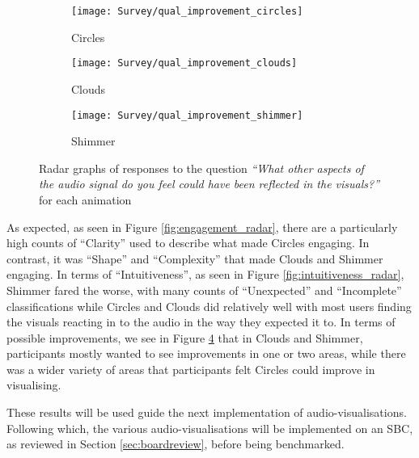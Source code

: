 \documentclass[../initial_thesis.tex]{subfiles}
\begin{document}
\begin{figure}
  \begin{subfigure}{0.5\textwidth}
    \centering
    \texttt{[image: Survey/qual\_improvement\_circles]}
    \caption{Circles}
    \label{fig:improvement_circles}
  \end{subfigure}
  \begin{subfigure}{0.5\textwidth}
    \centering
    \texttt{[image: Survey/qual\_improvement\_clouds]}
    \caption{Clouds}
    \label{fig:improvement_clouds}
  \end{subfigure}
  \begin{subfigure}{0.5\textwidth}
    \centering
    \texttt{[image: Survey/qual\_improvement\_shimmer]}
    \caption{Shimmer}
    \label{fig:improvement_shimmer}
  \end{subfigure}
  \caption{Radar graphs of responses to the question \textit{``What other aspects of the audio signal do you feel could have been reflected in the visuals?''} for each animation}
  \label{fig:improvement_radar}
\end{figure}

As expected, as seen in Figure \ref{fig:engagement_radar}, there are a particularly high counts of ``Clarity'' used to describe what made Circles engaging. In contrast, it was ``Shape'' and ``Complexity'' that made Clouds and Shimmer engaging. In terms of ``Intuitiveness'', as seen in Figure \ref{fig:intuitiveness_radar}, Shimmer fared the worse, with many counts of ``Unexpected'' and ``Incomplete'' classifications while Circles and Clouds did relatively well with most users finding the visuals reacting in to the audio in the way they expected it to. In terms of possible improvements, we see in Figure \ref{fig:improvement_radar} that in Clouds and Shimmer, participants mostly wanted to see improvements in one or two areas, while there was a wider variety of areas that participants felt Circles could improve in visualising.\par

These results will be used guide the next implementation of audio-visualisations. Following which, the various audio-visualisations will be implemented on an SBC, as reviewed in Section \ref{sec:boardreview}, before being benchmarked. 
\end{document}
